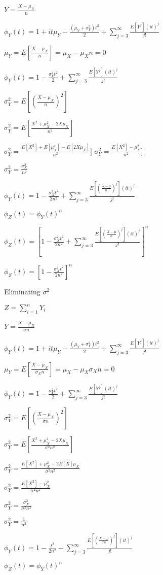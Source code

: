 \(Y=\frac{X-\mu_X }{n}\)

\(\phi_Y(t)=1+it\mu_Y -\frac{(\mu_Y +\sigma_Y^2 )t^2}{2} +\sum_{j=3}^{\infty }\frac{E[Y^j](it)^j}{j!}\)

\(\mu_Y =E[\frac{X-\mu_X }{n}] ={\mu_X -\mu_X }{n}=0\)

\(\phi_Y(t)=1-\frac{\sigma_Y^2t^2}{2} +\sum_{j=3}^{\infty }\frac{E[Y^j](it)^j}{j!}\)

\(\sigma^2_Y =E[(\frac{X-\mu_X }{n})^2]\)

\(\sigma^2_Y =E[\frac{X^2+\mu^2_X-2X\mu_X }{n^2}]\)

\(\sigma^2_Y =\frac{E[X^2]+E[\mu^2_X]-E[2X\mu_X] }{n^2}]\)
\(\sigma^2_Y =\frac{E[X^2]-\mu^2_X}{n^2}]\)

\(\sigma^2_Y =\frac{\sigma^2_X}{n^2}\)

\(\phi_Y(t)=1-\frac{\sigma_X^2t^2}{2n^2} +\sum_{j=3}^{\infty }\frac{E[(\frac{X-\mu}{n})^j](it)^j}{j!}\)

\(\phi_Z(t)=\phi_Y(t)^n\)

\(\phi_Z(t)=[1-\frac{\sigma_X^2t^2}{2n^2} +\sum_{j=3}^{\infty }\frac{E[(\frac{X-\mu}{n})^j](it)^j}{j!}]^n\)

\(\phi_Z(t)=[1-\frac{\sigma_X^2t^2}{2n^2}]^n\)

Eliminating \(\sigma^2 \)

\(Z=\sum_{i=1}^nY_i\)

\(Y=\frac{X-\mu_X }{\sigma n}\)

\(\phi_Y(t)=1+it\mu_Y -\frac{(\mu_Y +\sigma_Y^2 )t^2}{2} +\sum_{j=3}^{\infty }\frac{E[Y^j](it)^j}{j!}\)

\(\mu_Y =E[\frac{X-\mu_X }{\sigma_X n}] ={\mu_X -\mu_X }{\sigma_X n}=0\)

\(\phi_Y(t)=1-\frac{\sigma_Y^2t^2}{2} +\sum_{j=3}^{\infty }\frac{E[Y^j](it)^j}{j!}\)

\(\sigma^2_Y =E[(\frac{X-\mu_X }{\sigma n})^2]\)

\(\sigma^2_Y =E[\frac{X^2+\mu^2_X-2X\mu_X }{\sigma^2 n^2}]\)

\(\sigma^2_Y =\frac{E[X^2]+\mu^2_X-2E[X]\mu_X }{\sigma^2 n^2}\)

\(\sigma^2_Y =\frac{E[X^2]-\mu^2_X}{\sigma^2 n^2}\)

\(\sigma^2_Y =\frac{\sigma^2_X}{\sigma^2 n^2}\)

\(\sigma^2_Y =\frac{1}{n^2}\)

\(\phi_Y(t)=1-\frac{t^2}{2n^2} +\sum_{j=3}^{\infty }\frac{E[(\frac{X-\mu}{\sigma n})^j](it)^j}{j!}\)

\(\phi_Z(t)=\phi_Y(t)^n\)

